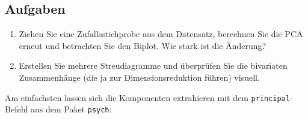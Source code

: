 \documentclass[12pt,ngerman,]{book}
\theoremstyle{definition}
\theoremstyle{definition}
\theoremstyle{remark}
\let\BeginKnitrBlock\begin \let\EndKnitrBlock\end
\begin{document}
\subsection{Aufgaben}\label{aufgaben-12}

\BeginKnitrBlock{rmdexercises}
\begin{enumerate}
\def\labelenumi{\arabic{enumi}.}
\item
  Ziehen Sie eine Zufallsstichprobe aus dem Datensatz, berechnen Sie die
  PCA erneut und betrachten Sie den Biplot. Wie stark ist die Änderung?
\item
  Erstellen Sie mehrere Streudiagramme und überprüfen Sie die bivariaten
  Zusammenhänge (die ja zur Dimensionsreduktion führen) visuell.
\end{enumerate}
\EndKnitrBlock{rmdexercises}

Am einfachsten lassen sich die Komponenten extrahieren mit dem
\texttt{principal}-Befehl aus dem Paket \texttt{psych}:
\end{document}
